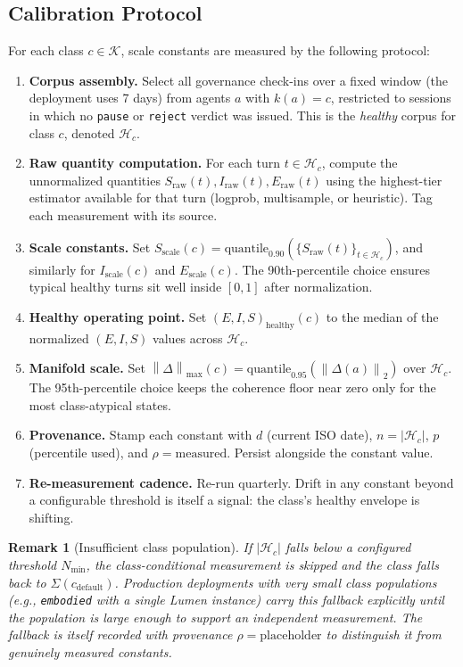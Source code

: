 \documentclass[11pt,twocolumn]{article}
\newtheorem{remark}[theorem]{Remark}
\newcommand{\norm}[1]{\left\lVert #1 \right\rVert}
\begin{document}
\subsection{Calibration Protocol}

For each class $c \in \mathcal{K}$, scale constants are measured by
the following protocol:

\begin{enumerate}
  \item \textbf{Corpus assembly.} Select all governance check-ins
    over a fixed window (the deployment uses 7 days) from agents
    $a$ with $k(a) = c$, restricted to sessions in which no
    \texttt{pause} or \texttt{reject} verdict was issued. This is
    the \emph{healthy} corpus for class $c$, denoted $\mathcal{H}_c$.
  \item \textbf{Raw quantity computation.} For each
    turn $t \in \mathcal{H}_c$, compute the unnormalized quantities
    $S_{\text{raw}}(t), I_{\text{raw}}(t), E_{\text{raw}}(t)$ using
    the highest-tier estimator available for that turn (logprob,
    multisample, or heuristic). Tag each measurement with its
    source.
  \item \textbf{Scale constants.} Set
    $S_{\text{scale}}(c) = \text{quantile}_{0.90}(\{S_{\text{raw}}(t)\}_{t \in \mathcal{H}_c})$,
    and similarly for $I_{\text{scale}}(c)$ and $E_{\text{scale}}(c)$.
    The 90th-percentile choice ensures typical healthy turns sit
    well inside $[0,1]$ after normalization.
  \item \textbf{Healthy operating point.} Set
    $(E,I,S)_{\text{healthy}}(c)$ to the median of the
    normalized $(E, I, S)$ values across $\mathcal{H}_c$.
  \item \textbf{Manifold scale.} Set
    $\norm{\Delta}_{\max}(c) = \text{quantile}_{0.95}(\norm{\Delta(a)}_2)$
    over $\mathcal{H}_c$. The 95th-percentile choice keeps the
    coherence floor near zero only for the most class-atypical
    states.
  \item \textbf{Provenance.} Stamp each constant with $d$
    (current ISO date), $n = |\mathcal{H}_c|$, $p$ (percentile
    used), and $\rho = \text{measured}$. Persist alongside the
    constant value.
  \item \textbf{Re-measurement cadence.} Re-run quarterly. Drift
    in any constant beyond a configurable threshold is itself a
    signal: the class's healthy envelope is shifting.
\end{enumerate}

\begin{remark}[Insufficient class population]
\label{rem:insufficient-class}
If $|\mathcal{H}_c|$ falls below a configured threshold
$N_{\min}$, the class-conditional measurement is skipped and the
class falls back to $\Sigma(c_{\text{default}})$. Production
deployments with very small class populations (e.g.,
\texttt{embodied} with a single Lumen instance) carry this
fallback explicitly until the population is large enough to
support an independent measurement. The fallback is itself
recorded with provenance $\rho = \text{placeholder}$ to
distinguish it from genuinely measured constants.
\end{remark}
\end{document}
